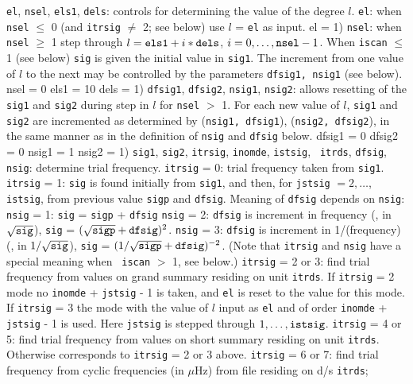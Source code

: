 \param
{\tt el}, {\tt nsel}, {\tt els1}, {\tt dels}:
controls for determining the value of the degree $l$.
\pparam
{\tt el}: when {\tt nsel} $\le$ 0 (and {\tt itrsig} $\not=$ 2;
see below) use $l$ = {\tt el} as input.
{ el = 1})
\pparam
{\tt nsel}: when {\tt nsel} $\ge$ 1 step through 
$l = {\tt els1} + i*{\tt dels}$, 
$i = 0, \ldots, {\tt nsel}-1$. When {\tt iscan} $\le$ 1 (see below) 
{\tt sig} is given the initial value in {\tt sig1}.
The increment from one value of $l$ to the next may be controlled
by the parameters {\tt dfsig1, nsig1} (see below).
{ nsel = 0
els1 = 10
dels = 1})
\param
{\tt dfsig1}, {\tt dfsig2}, {\tt nsig1}, {\tt nsig2}:
allows resetting of the {\tt sig1} and {\tt sig2}
during step in $l$ for {\tt nsel} $>$ 1.
For each new value of $l$,
{\tt sig1} and {\tt sig2} are incremented as determined by
({\tt nsig1, dfsig1}), ({\tt nsig2, dfsig2}),
in the same manner as in the definition of {\tt nsig} and {\tt dfsig} below.
{ dfsig1 = 0
dfsig2 = 0
nsig1 = 1
nsig2 = 1})
\param
{\tt sig1}, {\tt sig2}, {\tt itrsig}, {\tt inomde}, {\tt istsig}, {\tt
itrds}, {\tt dfsig}, {\tt nsig}: determine trial frequency.  
\pparam
{\tt itrsig} = 0: trial frequency taken from {\tt sig1}.  
\pparam
{\tt itrsig} = 1: {\tt sig} is found initially from {\tt sig1}, and then, 
for {\tt jstsig} $= 2, \ldots$, {\tt istsig}, from previous value
{\tt sigp} and {\tt dfsig}. 
\pparam
Meaning of {\tt dfsig} depends on {\tt nsig}:
\ppparam
{\tt nsig} = 1: {\tt sig} = {\tt sigp} + {\tt dfsig}
\ppparam
{\tt nsig} = 2: {\tt dfsig} is increment in frequency
({\ie}, in $\sqrt {{\tt sig}}$),\nwl
{\tt sig} = $( \sqrt { {\tt sigp}} + {\tt dfsig} )^2 $.
\ppparam
{\tt nsig} = 3: {\tt dfsig} is increment in 1/(frequency)
({\ie}, in $1/ \sqrt {{\tt sig}}$),
\nwl
{\tt sig} = $(1/\sqrt {{\tt sigp}} +{\tt dfsig} )^{-2} $.
\pparam
(Note that {\tt itrsig} and {\tt nsig} have a special meaning when {\tt
iscan} $>$ 1, see below.)
\pparam
{\tt itrsig} = 2 or 3: find trial frequency from values on
grand summary residing on unit {\tt itrds}. 
If {\tt itrsig} = 2 mode no {\tt inomde} + {\tt jstsig} - 1 is taken, 
and {\tt el} is reset to the value for this mode.
If {\tt itrsig} = 3 the mode with the value of $l$ input as {\tt el}
and of order {\tt inomde} + {\tt jstsig} - 1 is used.
Here {\tt jstsig} is stepped through $1, \ldots,{ \tt istsig}$.
\pparam
{\tt itrsig} = 4 or 5: find trial frequency from values on short
summary residing on unit {\tt itrds}. Otherwise corresponds to
{\tt itrsig} = 2 or 3 above.
\pparam
{\tt itrsig} = 6 or 7: find trial frequency from 
cyclic frequencies (in $\mu$Hz) from file residing on d/s {\tt itrds};
